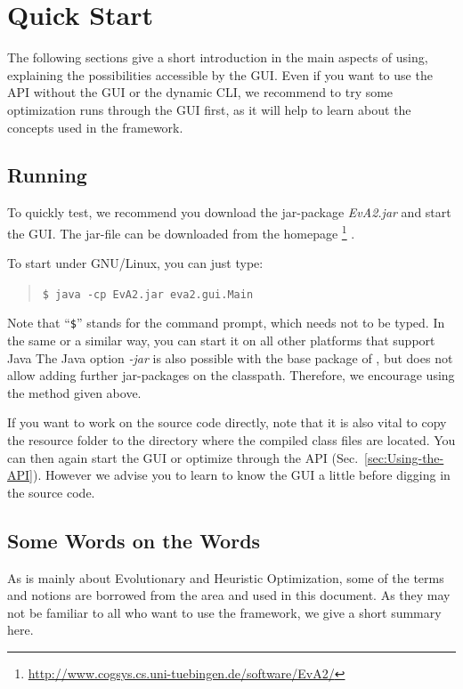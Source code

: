 \chapter{Quick Start\label{sec:Quick-Start}}

The following sections give a short introduction in the main aspects
of using, explaining the possibilities accessible by the
GUI. Even if you want to use the API without the GUI or the dynamic CLI, we recommend to try some optimization runs through the GUI first, as it will help
to learn about the concepts used in the framework.


\section{Running \label{sub:Quickly-Running-JavaEvA}}

To quickly test, we recommend you download the jar-package
\emph{EvA2.jar} and start the GUI. The jar-file can be downloaded
from the  homepage%
\footnote{\url{http://www.cogsys.cs.uni-tuebingen.de/software/EvA2/}%
} \cite{EvA2HomePage}.

To start under GNU/Linux, you can just type:
\begin{quotation}
\texttt{\small \$ java -cp EvA2.jar eva2.gui.Main}{\small \par}
\end{quotation}
Note that ``\texttt{\$}'' stands for the command prompt, which needs
not to be typed. In the same or a similar way, you can start it on
all other platforms that support Java The Java option \emph{-jar}
is also possible with the base package of , but does not allow adding
further jar-packages on the classpath. Therefore, we encourage using
the method given above.

If you want to work on the source code directly, note that it is also
vital to copy the resource folder to the directory where the compiled
class files are located. You can then again start the GUI or optimize
through the API (Sec.~\ref{sec:Using-the-API}). However we advise
you to learn to know the GUI a little before digging in the source
code.


\section{Some Words on the Words}

As  is mainly about Evolutionary and Heuristic Optimization,
some of the terms and notions are borrowed from the area and used
in this document. As they may not be familiar to all who want to use
the framework, we give a short summary here.

